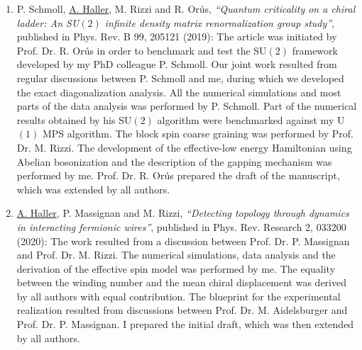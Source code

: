 \begin{enumerate}
    \item{P. Schmoll, \underline{A. Haller}, M. Rizzi and R. Orús, {\it ``Quantum criticality on a chiral ladder: An SU$(2)$ infinite density matrix renormalization group study''}, published in Phys. Rev. B 99, 205121 (2019):
    The article was initiated by Prof. Dr. R. Orús in order to benchmark and test the SU$(2)$ framework developed by my PhD colleague P. Schmoll. Our joint work resulted from regular discussions between P. Schmoll and me, during which we developed the exact diagonalization analysis. All the numerical simulations and most parts of the data analysis was performed by P. Schmoll. Part of the numerical results obtained by his SU$(2)$ algorithm were benchmarked against my U$(1)$ MPS algorithm. The block spin coarse graining was performed by Prof. Dr. M. Rizzi. The development of the effective-low energy Hamiltonian using Abelian bosonization and the description of the gapping mechanism was performed by me. Prof. Dr. R. Orús prepared the draft of the manuscript, which was extended by all authors.}
    \item{\underline{A. Haller}, P. Massignan and M. Rizzi, {\it ``Detecting topology through dynamics in interacting fermionic wires''}, published in Phys. Rev. Research 2, 033200 (2020):
    The work resulted from a discussion between Prof. Dr. P. Massignan and Prof. Dr. M. Rizzi. The numerical simulations, data analysis and the derivation of the effective spin model was performed by me. The equality between the winding number and the mean chiral displacement was derived by all authors with equal contribution. The blueprint for the experimental realization resulted from discussions between Prof. Dr. M. Aidelsburger and Prof. Dr. P. Massignan. I prepared the initial draft, which was then extended by all authors.}
\end{enumerate}





